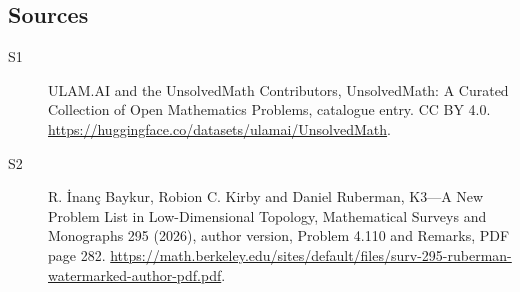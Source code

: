 \documentclass[11pt]{article}
\begin{document}
\subsection{Sources}
\begin{description}
\item[\hypertarget{source:statement:1}{S1}] ULAM.AI and the UnsolvedMath Contributors, UnsolvedMath: A Curated Collection of Open Mathematics Problems, catalogue entry. CC BY 4.0. \url{https://huggingface.co/datasets/ulamai/UnsolvedMath}.
\item[\hypertarget{source:statement:2}{S2}] R. İnanç Baykur, Robion C. Kirby and Daniel Ruberman, K3—A New Problem List in Low-Dimensional Topology, Mathematical Surveys and Monographs 295 (2026), author version, Problem 4.110 and Remarks, PDF page 282. \url{https://math.berkeley.edu/sites/default/files/surv-295-ruberman-watermarked-author-pdf.pdf}.
\end{description}
\label{end:statement}
\end{document}
